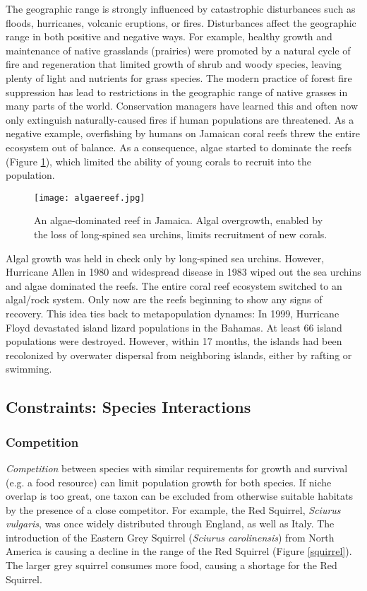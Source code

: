 \documentclass[12pt, oneside]{article}   	%
\begin{document}
The geographic range is strongly influenced by catastrophic disturbances such as floods, hurricanes, volcanic eruptions, or fires. Disturbances affect the geographic range in both positive and negative ways. For example, healthy growth and maintenance of native grasslands (prairies) were promoted by a natural cycle of fire and regeneration that limited growth of shrub and woody species, leaving plenty of light and nutrients for grass species. The modern practice of forest fire suppression has lead to restrictions in the geographic range of native grasses in many parts of the world.  Conservation managers have learned this and often now only extinguish naturally-caused fires if human populations are threatened. As a negative example, overfishing by humans on Jamaican coral reefs threw the entire ecosystem out of balance.  As a consequence, algae started to dominate the reefs (Figure \ref{reef}), which limited the ability of young corals to recruit into the population.  

\begin{figure}[hb]
	\centering
	\texttt{[image: algaereef.jpg]}
	\caption{An algae-dominated reef in Jamaica. Algal overgrowth, enabled by the loss of long-spined sea urchins, limits recruitment of new corals.\label{reef}}
\end{figure}

Algal growth was held in check only by long-spined sea urchins.  However, Hurricane Allen in 1980 and widespread disease in 1983 wiped out the sea urchins and algae dominated the reefs.  The entire coral reef ecosystem switched to an algal/rock system.  Only now are the reefs beginning to show any signs of recovery. This idea ties back to metapopulation dynamcs: In 1999, Hurricane Floyd devastated island lizard populations in the Bahamas.  At least 66 island populations were destroyed. However, within 17 months, the islands had been recolonized by overwater dispersal from neighboring islands, either by rafting or swimming.

\subsection{Constraints: Species Interactions}
\subsubsection{Competition}
\emph{Competition} between species with similar requirements for growth and survival (e.g. a food resource) can limit population growth for both species. If niche overlap is too great, one taxon can be excluded from otherwise suitable habitats by the presence of a close competitor.  For example, the Red Squirrel, \emph{Sciurus vulgaris}, was once widely distributed through England, as well as Italy.  The introduction of the Eastern Grey Squirrel (\emph{Sciurus carolinensis}) from North America is causing a decline in the range of the Red Squirrel (Figure \ref{squirrel}).  The larger grey squirrel consumes more food, causing a shortage for the Red Squirrel. 
\end{document}
